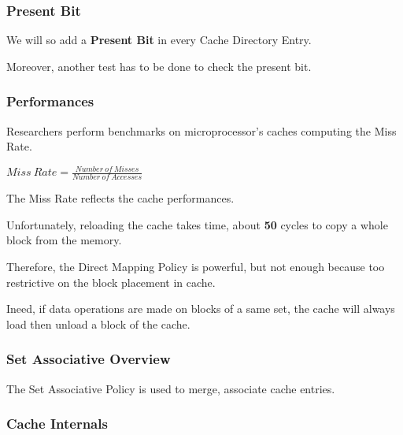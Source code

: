 
\begin{frame}
  \frametitle{Present Bit}

  We will so add a \textbf{Present Bit} in every Cache Directory Entry.

  \-

  Moreover, another test has to be done to check the present bit.
\end{frame}


\begin{frame}[containsverbatim]
  \frametitle{Performances}

  Researchers perform benchmarks on microprocessor's caches
  computing the Miss Rate.

  \-

  \begin{center}
    $Miss~Rate = \frac{Number~of~Misses}{Number~of~Accesses}$
  \end{center}

  \-

  The Miss Rate reflects the cache performances.

  \-

  Unfortunately, reloading the cache takes time, about \textbf{50} cycles
  to copy a whole block from the memory.

  \-

  Therefore, the Direct Mapping Policy is powerful, but not enough because
  too restrictive on the block placement in cache.

  \-

  Ineed, if data operations are made on blocks of a same set, the cache will
  always load then unload a block of the cache.
\end{frame}


\begin{frame}
  \frametitle{Set Associative Overview}

  The Set Associative Policy is used to merge, associate cache entries.

  \begin{center}
  \end{center}
\end{frame}


\begin{frame}
  \frametitle{Cache Internals}

  \begin{center}
  \end{center}
\end{frame}

